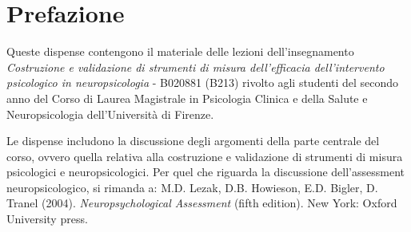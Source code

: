 %
%
%



\chapter*{Prefazione}
\label{chapter:prefazione}


Queste dispense contengono il materiale delle lezioni dell'insegnamento \emph{Costruzione e validazione di strumenti di misura dell'efficacia dell'intervento psicologico in neuropsicologia} - B020881 (B213) rivolto agli studenti del secondo anno del Corso di Laurea Magistrale in Psicologia Clinica e della Salute e Neuropsicologia dell'Università di Firenze.

Le dispense includono la discussione degli argomenti della parte centrale del corso, ovvero quella relativa alla costruzione e validazione di strumenti di misura psicologici e neuropsicologici.  
Per quel che riguarda la discussione dell'assessment neuropsicologico, si rimanda a: M.D. Lezak, D.B. Howieson, E.D. Bigler, D. Tranel (2004). \emph{Neuropsychological Assessment} (fifth edition). New York: Oxford University press.

